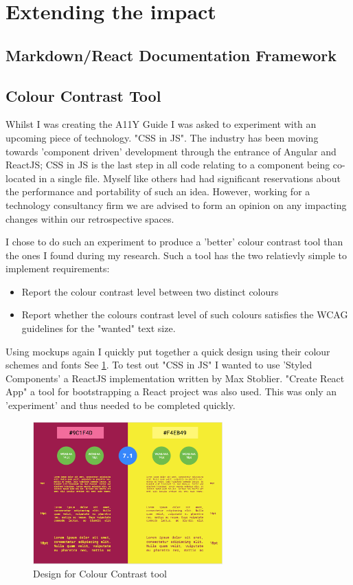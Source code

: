 \section{Extending the impact}
\subsection{Markdown/React Documentation Framework}
\subsection{Colour Contrast Tool}
Whilst I was creating the A11Y Guide I was asked to experiment with an
upcoming piece of technology. "CSS in JS". The industry has been moving
towards 'component driven' development through the entrance of Angular and
ReactJS; CSS in JS is the last step in all code relating to a
component being co-located in a single file. Myself like others had had
significant reservations about the performance and portability of such an
idea. However, working for a technology consultancy firm we are advised to
form an opinion on any impacting changes within our retrospective spaces.

I chose to do such an experiment to produce a 'better' colour contrast tool
than the ones I found during my research. Such a tool has the two relatievly
simple to implement requirements:
\begin{itemize}
\item Report the colour contrast level between two distinct colours
\item Report whether the colours contrast level of such colours satisfies the
 WCAG guidelines for the "wanted" text size.
\end{itemize}

Using mockups again I quickly put together a quick design using their colour
schemes and fonts See \ref{fig:colour_contrast_1}. To test out "CSS in JS" I
wanted to use 'Styled Components' a ReactJS implementation written by Max
Stoblier. "Create React App" a tool for bootstrapping a React project was also
used. This was only an 'experiment' and thus needed to be completed quickly.

\begin{figure}[H]
\centering
\includegraphics[width=0.65\textwidth]{figures/colour_contrast_1}
\captionsetup{justification=centering}
\caption{Design for Colour Contrast tool
\label{fig:colour_contrast_1}}
\end{figure}

